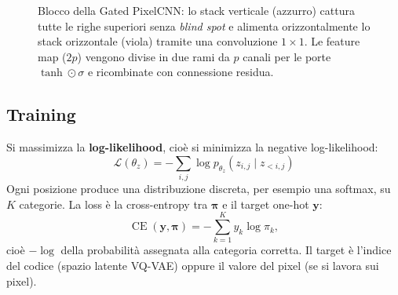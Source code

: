 \documentclass[11pt,a4paper]{article}
\newcommand{\Loss}{\mathcal{L}}
\begin{document}
\begin{figure}[H]
{%
}
\caption{Blocco della Gated PixelCNN: lo stack verticale (azzurro) cattura tutte le righe superiori senza \emph{blind spot} e alimenta orizzontalmente lo stack orizzontale (viola) tramite una convoluzione $1\times 1$. Le feature map ($2p$) vengono divise in due rami da $p$ canali per le porte $\tanh \odot \sigma$ e ricombinate con connessione residua.}
\end{figure}

\subsection{Training}

Si massimizza la \textbf{log-likelihood}, cioè si minimizza la negative log-likelihood:
\[
\boxed{\Loss(\theta_z)=-\sum_{i,j}\log p_{\theta_z}(z_{i,j}\mid z_{<i,j})}
\]
Ogni posizione produce una distribuzione discreta, per esempio una softmax, su $K$ categorie. La loss è la cross-entropy tra $\boldsymbol{\pi}$ e il target one-hot $\mathbf{y}$:
\[
\operatorname{CE}(\mathbf{y},\boldsymbol{\pi})=-\sum_{k=1}^{K}y_k\log\pi_k ,
\]
cioè $-\log$ della probabilità assegnata alla categoria corretta. Il target è l'indice del codice (spazio latente VQ-VAE)
oppure il valore del pixel (se si lavora sui pixel).
\end{document}
